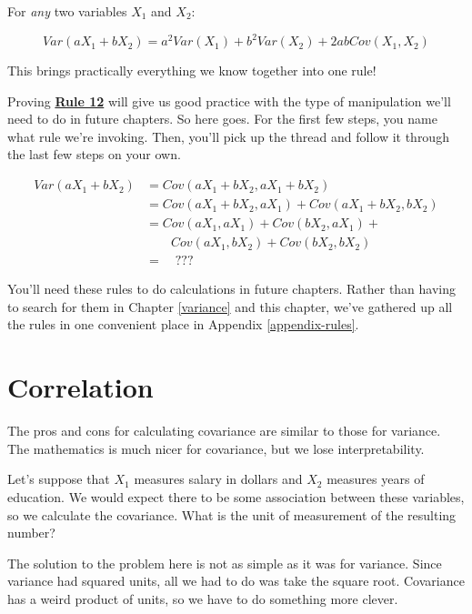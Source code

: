 \documentclass[
]{book}
\begin{document}
For \emph{any} two variables \(X_{1}\) and \(X_{2}\):

\[
Var(aX_{1} + bX_{2}) = 
    a^2Var(X_{1}) + b^2Var(X_{2}) + 2abCov(X_{1}, X_{2})
\]

This brings practically everything we know together into one rule!

Proving \protect\hyperlink{Rule12}{\textbf{Rule 12}} will give us good practice with the type of manipulation we'll need to do in future chapters. So here goes. For the first few steps, you name what rule we're invoking. Then, you'll pick up the thread and follow it through the last few steps on your own.

\begin{align}
Var(aX_{1} + bX_{2}) &= Cov(aX_{1} + bX_{2}, aX_{1} + bX_{2}) \\
    &= Cov(aX_{1} + bX_{2}, aX_{1}) + Cov(aX_{1} + bX_{2}, bX_{2}) \\
    &=  Cov(aX_{1}, aX_{1}) + 
        Cov(bX_{2}, aX_{1}) + \\
    &   \qquad Cov(aX_{1}, bX_{2}) + 
        Cov(bX_{2}, bX_{2}) \\
    &= \quad ???
\end{align}

You'll need these rules to do calculations in future chapters. Rather than having to search for them in Chapter \ref{variance} and this chapter, we've gathered up all the rules in one convenient place in Appendix \ref{appendix-rules}.

\hypertarget{covariance-correlation}{%
\section{Correlation}\label{covariance-correlation}}

The pros and cons for calculating covariance are similar to those for variance. The mathematics is much nicer for covariance, but we lose interpretability.

Let's suppose that \(X_{1}\) measures salary in dollars and \(X_{2}\) measures years of education. We would expect there to be some association between these variables, so we calculate the covariance. What is the unit of measurement of the resulting number?

The solution to the problem here is not as simple as it was for variance. Since variance had squared units, all we had to do was take the square root. Covariance has a weird product of units, so we have to do something more clever.
\end{document}
